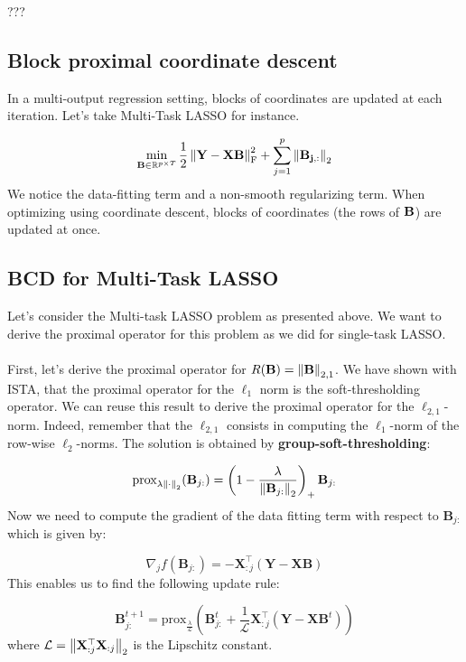\documentclass[a4paper,10pt]{article}
\theoremstyle{definition}
\begin{document}
???


\subsection*{Block proximal coordinate descent}

In a multi-output regression setting, blocks of coordinates are updated at each iteration. Let's take Multi-Task
LASSO for instance. 

\begin{equation*}
    \min_{\mathbf{B} \in \mathbb{R}^{p \times T}}
    \frac{1}{2} \left \lVert \bf{Y - XB} \right \rVert^2_\text{F}
    + \sum_{j=1}^p \left \lVert \bf{B}_{j, :} \right \rVert_2
\end{equation*}
%
We notice the data-fitting term and a non-smooth regularizing term. When optimizing using
coordinate descent, blocks of coordinates (the rows of $\bf{B}$) are updated at once.

\subsection*{BCD for Multi-Task LASSO}

Let's consider the Multi-task LASSO problem as presented above. We want to derive the proximal operator
for this problem as we did for single-task LASSO.
\\
\\
First, let's derive the proximal operator for $R(\mathbf{B}) = \left \lVert \mathbf{B} \right \rVert_{2, 1}$. 
We have shown with ISTA, that the proximal operator for the $\ell_1$ norm is the
soft-thresholding operator. We can reuse this result to derive the proximal operator for
the $\ell_{2,1}$-norm. Indeed, remember that the $\ell_{2,1}$ consists in computing the
$\ell_1$-norm of the row-wise $\ell_2$-norms. The solution is obtained by \textbf{group-soft-thresholding}:

\begin{equation*}
    \text{prox}_{\lambda \left \lVert \cdot \right \rVert_2}
    (\mathbf{B}_{j:}) = 
    \left(
        1 - \frac{\lambda}{\left \lVert \mathbf{B}_{j:} \right \rVert_2}
    \right)_+
    \mathbf{B}_{j:}
\end{equation*}
%
Now we need to compute the gradient of the data fitting term with respect to $\mathbf{B}_{j:}$
which is given by: 

\begin{equation*}
    \nabla_j f(\mathbf{B}_{j:}) 
    = -\mathbf{X}_{:j}^{\top}
    (\mathbf{Y} - \mathbf{XB})
\end{equation*}
%
This enables us to find the following update rule:

\begin{equation*}
    \mathbf{B}_{j:}^{t+1} = 
    \text{prox}_{\frac{\lambda}{\mathcal{L}}}\left(
        \mathbf{B}_{j:}^{t}
        + \frac{1}{\mathcal{L}}
        \mathbf{X}_{:j}^{\top}
        (\mathbf{Y} - \mathbf{X}\mathbf{B}^t)
    \right)
\end{equation*}
%
where $\mathcal{L} = \left \lVert \mathbf{X}_{:j}^{\top}\mathbf{X}_{:j} \right \rVert_2$ is the Lipschitz constant.

\newpage


\end{document}
